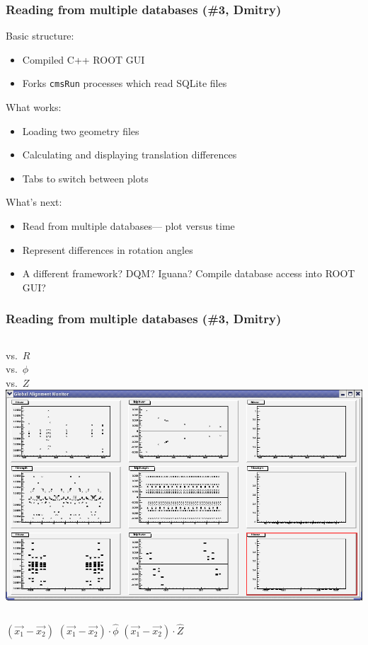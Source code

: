 \documentclass[compress]{beamer}
\begin{document}
\begin{frame}
\frametitle{Reading from multiple databases (\#3, Dmitry)}

Basic structure:
\begin{itemize}
  \item Compiled C++ ROOT GUI
  \item Forks {\tt cmsRun} processes which read SQLite files
\end{itemize}

What works:
\begin{itemize}
  \item Loading two geometry files
  \item Calculating and displaying translation differences
  \item Tabs to switch between plots
\end{itemize}

\vfill
What's next:
\begin{itemize}
  \item Read from multiple databases--- plot versus time
  \item Represent differences in rotation angles
  \item A different framework?  DQM?  Iguana?  Compile database access into ROOT GUI?
\end{itemize}
\end{frame}

\begin{frame}
\frametitle{Reading from multiple databases (\#3, Dmitry)}
\begin{columns}
vs.\ $R$ \\

\vspace{1 cm}
vs.\ $\phi$ \\

\vspace{1 cm}
vs.\ $Z$ \\
\includegraphics[width=\linewidth]{screen_shot.png}
\end{columns}

\vfill
\hfill $(\vec{x_1}-\vec{x_2})$ \hfill $(\vec{x_1}-\vec{x_2})\cdot\hat{\phi}$ \hfill $(\vec{x_1}-\vec{x_2})\cdot\hat{Z}$ \hfill
\end{frame}
\end{document}

